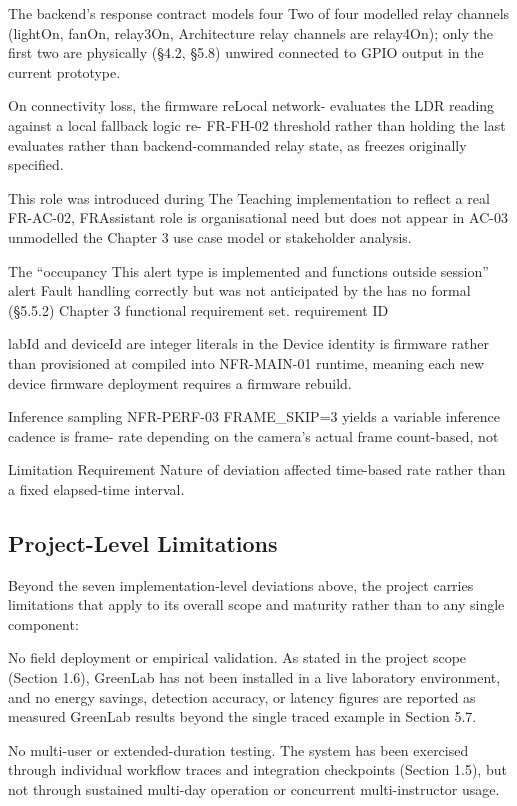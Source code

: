The backend's response contract models four
Two of four modelled relay channels (lightOn, fanOn, relay3On,
Architecture
relay channels are relay4On); only the first two are physically
(§4.2, §5.8)
unwired connected to GPIO output in the current
prototype.

On connectivity loss, the firmware reLocal network-
evaluates the LDR reading against a local
fallback logic re-
FR-FH-02 threshold rather than holding the last
evaluates rather than
backend-commanded relay state, as
freezes
originally specified.

This role was introduced during
The Teaching implementation to reflect a real
FR-AC-02, FRAssistant role is organisational need but does not appear in
AC-03
unmodelled the Chapter 3 use case model or stakeholder
analysis.

The ``occupancy
This alert type is implemented and functions
outside session'' alert Fault handling
correctly but was not anticipated by the
has no formal (§5.5.2)
Chapter 3 functional requirement set.
requirement ID

labId and deviceId are integer literals in the
Device identity is
firmware rather than provisioned at
compiled into NFR-MAIN-01
runtime, meaning each new device
firmware
deployment requires a firmware rebuild.

Inference sampling
NFR-PERF-03 FRAME_SKIP=3 yields a variable inference
cadence is frame-
rate depending on the camera's actual frame
count-based, not


Limitation Requirement Nature of deviation
affected
time-based rate rather than a fixed elapsed-time interval.


\subsection{Project-Level Limitations}


Beyond the seven implementation-level deviations above, the project carries limitations
that apply to its overall scope and maturity rather than to any single component:

 No field deployment or empirical validation. As stated in the project scope
(Section 1.6), GreenLab has not been installed in a live laboratory environment,
and no energy savings, detection accuracy, or latency figures are reported as
measured GreenLab results beyond the single traced example in Section 5.7.

 No multi-user or extended-duration testing. The system has been exercised
through individual workflow traces and integration checkpoints (Section 1.5), but
not through sustained multi-day operation or concurrent multi-instructor usage.

